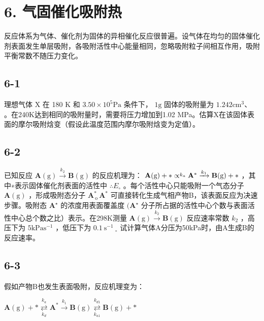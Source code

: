 \section*{6. 气固催化吸附热}
反应体系为⽓体、催化剂为固体的异相催化反应很普遍。设⽓体在均匀的固体催化剂表⾯发⽣单层吸附，各吸附活性中⼼能量相同，忽略吸附粒⼦间相互作⽤，吸附平衡常数不随压⼒变化。

\subsection*{6-1}
理想⽓体 X 在 180 K 和 $3 . 5 0 \times 1 0 ^ { 5 } \mathrm { P a }$ 条件下， $1 \mathrm { g }$ 固体的吸附量为 $1 . 2 4 2 \mathrm { c m } ^ { 3 } 、$ 。在240K达到相同的吸附量时，需要将压⼒增加到1.02 MPa。估算X在该固体表⾯的摩尔吸附焓变（假设此温度范围内摩尔吸附焓变为定值）。

\subsection*{6-2}
已知反应 $\mathbf { A } ( \mathrm { g } ) \xrightarrow { k _ { 2 } } \mathbf { B } ( \mathrm { g } )$ 的反应机理为： ${ \bf A } ( \mathrm { g } ) + * \propto \stackrel { k _ { a } } {  } { \bf A } ^ { * } \xrightarrow { k _ { 1 } } { \bf B } ( \mathrm { g } ) + *$ ，其中∗表⽰固体催化剂表⾯的活性中 $\therefore E _ { \circ }$ 。每个活性中⼼只能吸附⼀个⽓态分⼦ $\mathbf { A } ( \mathrm { g } )$ ，形成吸附态分⼦ $\mathbf { A } _ { \mathrm { ~ o ~ } } ^ { \ast } \mathbf { A } _ { \mathrm { ~ } } ^ { \ast }$ 可直接转化⽣成⽓相产物B，该表⾯反应为决速步骤。吸附态 $\mathbf { A } ^ { \star }$ 的浓度⽤表⾯覆盖度 $( \mathbf { A } ^ { \star }$ 分⼦所占据的活性中⼼个数与表⾯活性中⼼总个数之⽐）表⽰。在298K测量 $\mathbf { A } ( \mathrm { g } ) \xrightarrow { k _ { 2 } } \mathbf { B } ( \mathrm { g } )$ 反应速率常数 $k _ { 2 }$ ，⾼压下为 $5 \mathrm { k P a } \mathrm { s } ^ { - 1 }$ ，低压下为 $0 . 1 { \mathrm { ~ } } { \mathrm { s } } ^ { - 1 } { \mathrm { ~ } } _ { \circ }$ 试计算⽓体A分压为50kPa时，由A⽣成B的反应速率。

\subsection*{6-3}
假如产物B也发⽣表⾯吸附，反应机理变为：

$
\mathbf {A} (\mathrm{g}) + * \underset {k _ {d}} {\overset {k _ {a}} {\rightleftarrows}} \mathbf {A} ^ {*} \xrightarrow {k _ {1}} \mathbf {B} (\mathrm{g}) \underset {k _ {a 1}} {\overset {k _ {d 1}} {\rightleftarrows}} \mathbf {B} (\mathrm{g}) + *
$

